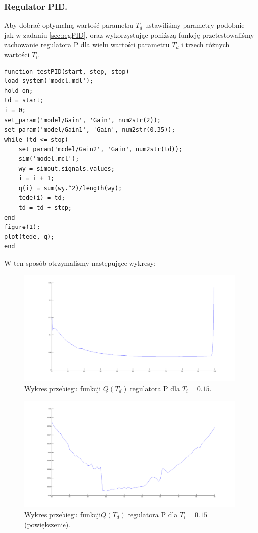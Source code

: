 \documentclass[a4paper,10pt]{article}
\begin{document}
\subsubsection{Regulator PID.}\label{sec:optPID}
Aby dobrać optymalną wartość parametru $T_{d}$ ustawiliśmy parametry podobnie jak w zadaniu \ref{sec:regPID}, oraz wykorzystując poniższą funkcję przetestowaliśmy zachowanie regulatora P dla wielu wartości parametru $T_{d}$ i trzech różnych wartości $T_{i}$. \\
\newpage \begin{lstlisting}[caption=Funkcja testująca regulator P.]
function testPID(start, step, stop)
load_system('model.mdl');
hold on;
td = start;
i = 0;
set_param('model/Gain', 'Gain', num2str(2));
set_param('model/Gain1', 'Gain', num2str(0.35));
while (td <= stop)
    set_param('model/Gain2', 'Gain', num2str(td));
    sim('model.mdl');
    wy = simout.signals.values;
    i = i + 1;
    q(i) = sum(wy.^2)/length(wy);
    tede(i) = td;
    td = td + step;
end
figure(1);
plot(tede, q);
end
\end{lstlisting}
W ten sposób otrzymalismy następujące wykresy: \\
\begin{figure}[!h]
    \centering
	\includegraphics[width=130mm]{CW2-regulatorPID-ti15-opt1.png}
	\caption{Wykres przebiegu funkcji $Q(T_{d})$ regulatora P dla $T_{i}=0.15$.}
    \label{fig:regulatorPIDti15opt1}
\end{figure}
\begin{figure}[!h]
    \centering
	\includegraphics[width=130mm]{CW2-regulatorPID-ti15-opt2.png}
	\caption{Wykres przebiegu funkcji$Q(T_{d})$ regulatora P dla $T_{i}=0.15$ (powiększenie).}
    \label{fig:regulatorPIDti15opt2}
\end{figure}
\end{document}
